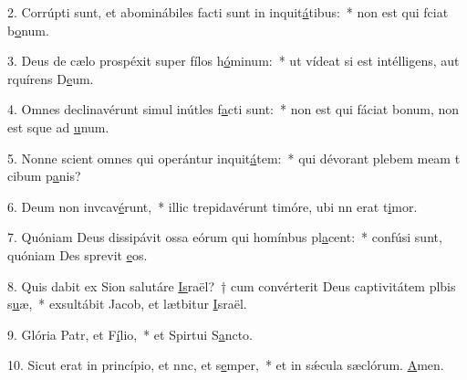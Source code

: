 2. Corrúpti sunt, et abominábiles facti sunt in inquit\uline{á}tibus:~* non est qui fciat b\uline{o}num.\par 
3. Deus de cælo prospéxit super fílos h\uline{ó}minum:~* ut vídeat si est intélligens, aut rquírens D\uline{e}um.\par 
4. Omnes declinavérunt simul inútles f\uline{a}cti sunt:~* non est qui fáciat bonum, non est sque ad \uline{u}num.\par 
5. Nonne scient omnes qui operántur inquit\uline{á}tem:~* qui dévorant plebem meam t cibum p\uline{a}nis?\par 
6. Deum non invcav\uline{é}runt,~* illic trepidavérunt timóre, ubi nn erat t\uline{i}mor.\par 
7. Quóniam Deus dissipávit ossa eórum qui homínbus pl\uline{a}cent:~* confúsi sunt, quóniam Des sprevit \uline{e}os.\par 
8. Quis dabit ex Sion salutáre \uline{Is}raël?~† cum convérterit Deus captivitátem plbis s\uline{u}æ,~* exsultábit Jacob, et lætbitur \uline{I}sraël.\par 
9. Glória Patr, et F\uline{í}lio,~* et Spirtui S\uline{a}ncto.\par 
10. Sicut erat in princípio, et nnc, et s\uline{e}mper,~* et in sǽcula sæclórum. \uline{A}men.\par 
